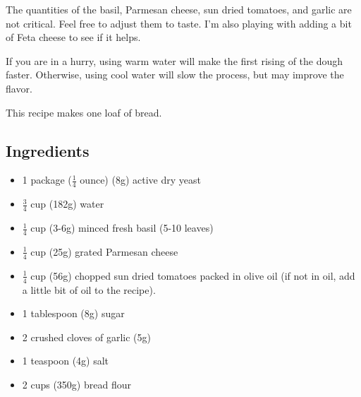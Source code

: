 \documentclass[10pt, openany]{book}
\begin{document}
The quantities of the basil, Parmesan cheese, sun dried tomatoes, and garlic are not critical.  Feel free to adjust them to taste.  I'm also playing with adding a bit of Feta cheese to see if it helps.

If you are in a hurry, using warm water will make the first rising of the dough faster.  Otherwise, using cool water will slow the process, but may improve the flavor.

This recipe makes one loaf of bread.

\subsection{Ingredients}
\begin{itemize}
  \item 1 package ($\frac{1}{4}$ ounce) (8g) active dry yeast
  \item $\frac{3}{4}$ cup (182g) water
  \item $\frac{1}{4}$ cup (3-6g) minced fresh basil (5-10 leaves)
  \item $\frac{1}{4}$ cup (25g) grated Parmesan cheese
  \item $\frac{1}{4}$ cup (56g) chopped sun dried tomatoes packed in olive oil (if not in oil, add a little bit of oil to the recipe).
  \item 1 tablespoon (8g) sugar
  \item 2 crushed cloves of garlic (5g)
  \item 1 teaspoon (4g) salt
  \item 2 cups (350g) bread flour
\end{itemize}
\end{document}
